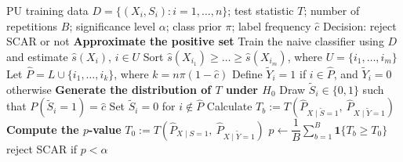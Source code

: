 \documentclass{article}
\begin{document}
\begin{algorithm}[!h]
\renewcommand{\algorithmicrequire}{\textbf{Input:}} %
\renewcommand{\algorithmicensure}{\textbf{Output:}} %
	\caption{Verifying the SCAR assumption (statistical test)} %
	\begin{algorithmic}[1] %
	    \REQUIRE
	    PU training data $D=\{(X_{i},S_{i}):i=1,\dots,n\}$; test statistic $T$;
	    number of repetitions $B$; significance level $\alpha$; class prior $\pi$;
	    label frequency $\hat{c}$
	    \ENSURE
	    Decision: reject SCAR or not
	    \STATE \textbf{Approximate the positive set}
	    \STATE Train the naive classifier using $D$ and estimate $\hat{s}(X_{i})$, $i\in U$ %
	    \STATE Sort $\hat{s}(X_{i_{1}})\geq\dots\geq\hat{s}(X_{i_{m}})$, where $U=\{i_{1},\dots,i_{m}\}$
	    \STATE Let $\hat{P}=L\cup\{i_{1},\dots,i_{k}\}$, where $k=n\pi(1-\hat{c})$ %
	    \STATE Define $\tilde{Y}_{i}=1$ if $i\in\hat{P}$, and $\tilde{Y}_{i}=0$ otherwise
	    \STATE \textbf{Generate the distribution of $T$ under $H_{0}$}
	    \STATE Draw $\tilde{S}_{i}\in\{0,1\}$ such that $P(\tilde{S}_{i}=1)=\hat{c}$ %
	    \ENDFOR
	    \STATE Set $\tilde{S}_{i}=0$ for $i\notin\hat{P}$
	    \STATE Calculate $T_{b}:=T\!\left(\hat{P}_{X\mid\tilde{S}=1},\ \hat{P}_{X\mid\tilde{Y}=1}\right)$
	    \ENDFOR
	    \STATE \textbf{Compute the $p$-value}
	    \STATE $T_{0}:=T\!\left(\hat{P}_{X\mid S=1},\ \hat{P}_{X\mid\tilde{Y}=1}\right)$ %
	    \STATE $p\leftarrow \dfrac{1}{B}\sum_{b=1}^{B}\mathbf{1}\{T_{b}\geq T_{0}\}$
	    \RETURN reject SCAR if $p<\alpha$
	\end{algorithmic}
\end{algorithm}
\end{document}
